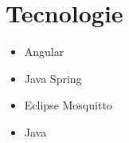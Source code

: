 \chapter{Tecnologie}\label{tecnologie}

\begin{itemize}
    \item Angular
    \item Java Spring
    \item Eclipse Mosquitto
    \item Java
\end{itemize}
